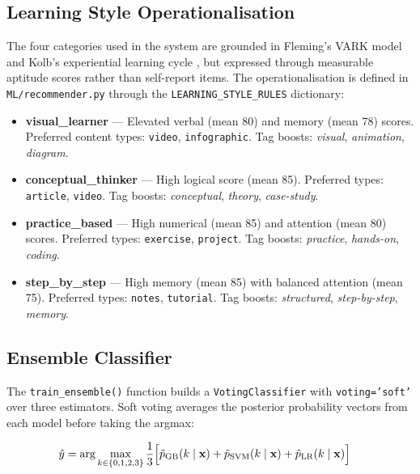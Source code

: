 \documentclass[12pt,a4paper]{article}
\begin{document}
\subsection{Learning Style Operationalisation}

The four categories used in the system are grounded in Fleming's
VARK model \cite{fleming1992} and Kolb's experiential learning
cycle \cite{kolb1984}, but expressed through measurable aptitude
scores rather than self-report items. The operationalisation is
defined in \texttt{ML/recommender.py} through the
\texttt{LEARNING\_STYLE\_RULES} dictionary:

\begin{itemize}[leftmargin=*]
  \item \textbf{visual\_learner} --- Elevated verbal (mean 80) and
    memory (mean 78) scores. Preferred content types:
    \texttt{video}, \texttt{infographic}. Tag boosts:
    \emph{visual}, \emph{animation}, \emph{diagram}.
  \item \textbf{conceptual\_thinker} --- High logical score (mean
    85). Preferred types: \texttt{article}, \texttt{video}. Tag
    boosts: \emph{conceptual}, \emph{theory}, \emph{case-study}.
  \item \textbf{practice\_based} --- High numerical (mean 85) and
    attention (mean 80) scores. Preferred types:
    \texttt{exercise}, \texttt{project}. Tag boosts:
    \emph{practice}, \emph{hands-on}, \emph{coding}.
  \item \textbf{step\_by\_step} --- High memory (mean 85) with
    balanced attention (mean 75). Preferred types:
    \texttt{notes}, \texttt{tutorial}. Tag boosts:
    \emph{structured}, \emph{step-by-step}, \emph{memory}.
\end{itemize}

\subsection{Ensemble Classifier}

The \texttt{train\_ensemble()} function builds a
\texttt{VotingClassifier} with \texttt{voting='soft'} over three
estimators. Soft voting averages the posterior probability vectors
from each model before taking the argmax:

\begin{align}
  \hat{y} &= \arg\max_{k \in \{0,1,2,3\}}
  \frac{1}{3}\Bigl[
    \hat{p}_{\text{GB}}(k \mid \mathbf{x})
  + \hat{p}_{\text{SVM}}(k \mid \mathbf{x})
  + \hat{p}_{\text{LR}}(k \mid \mathbf{x})
  \Bigr]
\end{align}
\end{document}
